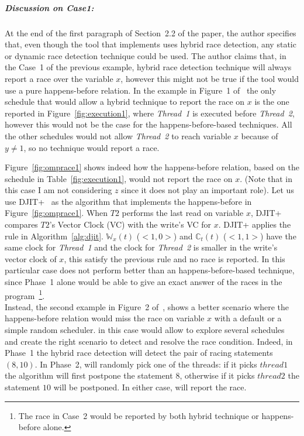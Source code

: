 \begin{refsection}
\subparagraph{Discussion on Case1:} At the end of the first paragraph of
Section~2.2 of the paper, the author specifies that, even though the tool that
implements \rfuz uses hybrid race detection, any static or dynamic race
detection technique could be used.
%
The author claims that, in the Case~1 of the previous example, hybrid race
detection technique will always report a race over the variable $x$, however
this might not be true if the tool would use a pure happens-before relation.
%
In the example in Figure~1 of~\cite{Sen:2008:RDR:1375581.1375584} the only
schedule that would allow a hybrid technique to report the race on $x$ is the
one reported in Figure~\ref{fig:execution1}, where \emph{Thread~1} is executed
before \emph{Thread~2}, however this would not be the case for the
happens-before-based techniques.
%
All the other schedules would not allow \emph{Thread~2} to reach variable $x$
because of $y \neq 1$, so no technique would report a race.

Figure~\ref{fig:omprace1} shows indeed how the happens-before relation, based
on the schedule in Table~\ref{fig:execution1}, would not report the race on
$x$.
%
(Note that in this case I am not considering $z$ since it does not play an
important role).
%
Let us use DJIT+~\cite{Pozniansky:2007:MEO:1228965.1228969, Flanagan:2009} as
the algorithm that implements the happens-before in Figure~\ref{fig:omprace1}.
%
When $T2$ performs the last read on variable $x$, DJIT+ compares $T2$'s Vector
Clock (VC) with the write's VC for $x$.
%
DJIT+ applies the rule in Algorithm~\ref{alg:djit}.
%
$\mathbb{W}_x(t)$ ($<1, 0>$) and $\mathbb{C}_t(t)$ ($<1, 1>$) have the same
clock for \emph{Thread~1} and the clock for \emph{Thread~2} is smaller in the
write's vector clock of $x$, this satisfy the previous rule and no race is
reported.
%
In this particular case \rfuz does not perform better than an
happens-before-based technique, since Phase~1 alone would be able to give an
exact answer of the races in the program~\footnote{The race in Case~2 would be
  reported by both hybrid technique or happens-before alone.}.
\\

\noindent
Instead, the second example in Figure~2
of~\cite{Sen:2008:RDR:1375581.1375584}, shows a better scenario where the
happens-before relation would miss the race on variable $x$ with a default or
a simple random scheduler.
%
\rfuz in this case would allow to explore several schedules and create the
right scenario to detect and resolve the race condition.
%
Indeed, in Phase~1 the hybrid race detection will detect the pair of racing
statements $(8, 10)$.
%
In Phase~2, \rfuz will randomly pick one of the threads: if it picks $thread1$
the algorithm will first postpone the statement $8$, otherwise if it picks
$thread2$ the statement $10$ will be postponed.
%
In either case, \rfuz will report the race.


\end{refsection}
